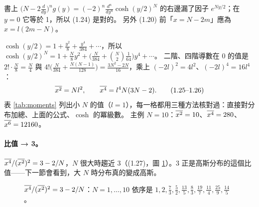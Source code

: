 \begin{errbox}[p.~8--9，(1.22)(1.23)]
書上 $\big(N-2\frac d{dy}\big)^ng(y)=(-2)^n\frac{d^n}{dy^n}\cosh(y/2)^N$ 的右邊漏了因子 $e^{Ny/2}$；在 $y=0$ 它等於 1，所以 (1.24) 是對的。
另外 (1.20) 前「$x=N-2m$」應為 $x=l(2m-N)$。
\end{errbox}

$\cosh(y/2)=1+\frac{y^2}{8}+\frac{y^4}{384}+\cdots$，所以 $\cosh(y/2)^N=1+\frac{N}{8}y^2+\big(\frac{N}{384}+\binom N2\frac1{64}\big)y^4+\cdots$。
二階、四階導數在 0 的值是 $2!\cdot\frac N8=\frac N4$ 與 $4!\big(\frac{N}{384}+\frac{N(N-1)}{128}\big)=\frac{3N^2-2N}{16}$，乘上 $(-2l)^2=4l^2$、$(-2l)^4=16l^4$：
\begin{equation}
\overline{x^2}=Nl^2,\qquad \overline{x^4}=l^4N(3N-2). \tag{1.25--1.26}
\end{equation}
表 \ref{tab:moments} 列出小 $N$ 的值（$l=1$），每一格都用三種方法核對過：直接對分布加總、上面的公式、$\cosh$ 的冪級數。
主例 $N=10$：$\overline{x^2}=10$、$\overline{x^4}=280$、$\overline{x^6}=12160$。

\begin{table}[H]
\centering
\small
\TabMoments
\caption{前幾個偶數次動差（$l=1$；奇數次動差都是 0）。}
\label{tab:moments}
\end{table}

\paragraph{比值 → 3。}
$\overline{x^4}/(\overline{x^2})^2=3-2/N$，$N$ 很大時趨近 3（(1.27)，圖 \ref{fig:kurtosis}）。3 正是高斯分布的這個比值——下一節會看到，大 $N$ 時分布真的變成高斯。

\begin{figure}[H]
\centering
\FigKurtosis
\caption{$\overline{x^4}/(\overline{x^2})^2=3-2/N$：$N=1,\dots,10$ 依序是 $1,2,\tfrac73,\tfrac52,\tfrac{13}5,\tfrac83,\tfrac{19}7,\tfrac{11}4,\tfrac{25}9,\tfrac{14}5$。}
\label{fig:kurtosis}
\end{figure}

